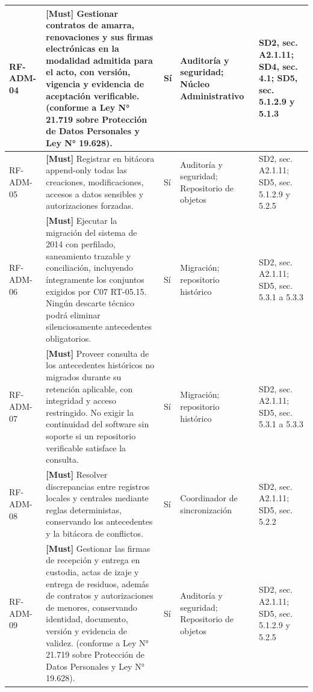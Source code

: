 \begin{paginaHorizontalSynaptix}
\begin{longtable}{|L{0.09\AnchoMatrizTDoce}|L{0.385\AnchoMatrizTDoce}|L{0.065\AnchoMatrizTDoce}|L{0.18\AnchoMatrizTDoce}|L{0.28\AnchoMatrizTDoce}|}
RF-\allowbreak{}ADM-\allowbreak{}04 &
\textbf{[Must]} Gestionar contratos de amarra, renovaciones y sus firmas electrónicas en la modalidad admitida para el acto, con versión, vigencia y evidencia de aceptación verificable. (conforme a Ley N° 21.719 sobre Protección de Datos Personales y Ley N° 19.628). &
Sí &
Auditoría y seguridad; Núcleo Administrativo &
SD2, sec. A2.1.11; SD4, sec. 4.1; SD5, sec. 5.1.2.9 y 5.1.3 \\ \hline

RF-\allowbreak{}ADM-\allowbreak{}05 &
\textbf{[Must]} Registrar en bitácora append-only todas las creaciones, modificaciones, accesos a datos sensibles y autorizaciones forzadas. &
Sí &
Auditoría y seguridad; Repositorio de objetos &
SD2, sec. A2.1.11; SD5, sec. 5.1.2.9 y 5.2.5 \\ \hline

RF-\allowbreak{}ADM-\allowbreak{}06 &
\textbf{[Must]} Ejecutar la migración del sistema de 2014 con perfilado, saneamiento trazable y conciliación, incluyendo íntegramente los conjuntos exigidos por C07 RT-05.15. Ningún descarte técnico podrá eliminar silenciosamente antecedentes obligatorios. &
Sí &
Migración; repositorio histórico &
SD2, sec. A2.1.11; SD5, sec. 5.3.1 a 5.3.3 \\ \hline

RF-\allowbreak{}ADM-\allowbreak{}07 &
\textbf{[Must]} Proveer consulta de los antecedentes históricos no migrados durante su retención aplicable, con integridad y acceso restringido. No exigir la continuidad del software sin soporte si un repositorio verificable satisface la consulta. &
Sí &
Migración; repositorio histórico &
SD2, sec. A2.1.11; SD5, sec. 5.3.1 a 5.3.3 \\ \hline

RF-\allowbreak{}ADM-\allowbreak{}08 &
\textbf{[Must]} Resolver discrepancias entre registros locales y centrales mediante reglas deterministas, conservando los antecedentes y la bitácora de conflictos. &
Sí &
Coordinador de sincronización &
SD2, sec. A2.1.11; SD5, sec. 5.2.2 \\ \hline

RF-\allowbreak{}ADM-\allowbreak{}09 &
\textbf{[Must]} Gestionar las firmas de recepción y entrega en custodia, actas de izaje y entrega de residuos, además de contratos y autorizaciones de menores, conservando identidad, documento, versión y evidencia de validez. (conforme a Ley N° 21.719 sobre Protección de Datos Personales y Ley N° 19.628). &
Sí &
Auditoría y seguridad; Repositorio de objetos &
SD2, sec. A2.1.11; SD5, sec. 5.1.2.9 y 5.2.5 \\ \hline


\end{longtable}
\end{paginaHorizontalSynaptix}

